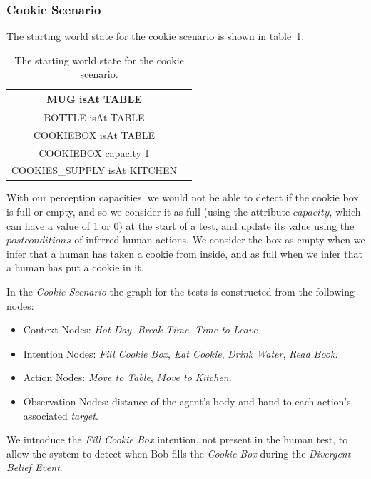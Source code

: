 \subsubsection{Cookie Scenario}
The starting world state for the cookie scenario is shown in table~\ref{table:observer_results-system_starting_state_cookie}.

 \begin{table}[h!]
\centering
\scriptsize
\renewcommand{\arraystretch}{1.3}
\begin{tabular}{|c|c|}
\hline
MUG isAt TABLE    \\ \hline
BOTTLE isAt TABLE  \\ \hline
COOKIEBOX isAt TABLE   \\ \hline
COOKIEBOX capacity 1    \\ \hline
COOKIES\_SUPPLY isAt KITCHEN    \\ \hline
\end{tabular}
\caption[Starting World State for the Cookie Scenario]{The starting world state for the cookie scenario.}
 \label{table:observer_results-system_starting_state_cookie}    
\end{table}


 With our perception capacities, we would not be able to detect if the cookie box is full or empty, and so we consider it as full (using the attribute $capacity$, which can have a value of 1 or 0) at the start of a test, and update its value using the $postconditions$ of inferred human actions. We consider the box as empty when we infer that a human has taken a cookie from inside, and as full when we infer that a human has put a cookie in it.


In the \textit{Cookie Scenario} the graph for the tests is constructed from the following nodes:
\begin{itemize}
\item Context Nodes: \textit{Hot Day}, \textit{Break Time}, \textit{Time to Leave}
\item Intention Nodes: \textit{Fill Cookie Box}, \textit{Eat Cookie}, \textit{Drink Water}, \textit{Read Book}.
\item Action Nodes: \textit{Move to Table}, \textit{Move to Kitchen}.
\item Observation Nodes: distance of the agent's body and hand to each action's associated \textit{target}.
\end{itemize}

We introduce the \textit{Fill Cookie Box} intention, not present in the human test, to allow the system to detect when Bob fills the \textit{Cookie Box} during the \textit{Divergent Belief Event}.

